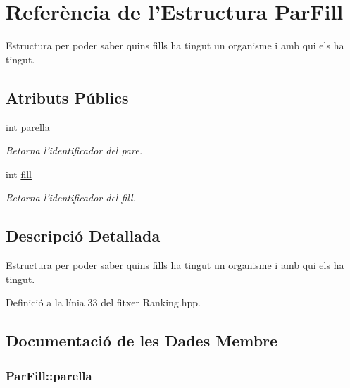 \hypertarget{struct_par_fill}{\section{Referència de l'Estructura Par\-Fill}
\label{struct_par_fill}
}


Estructura per poder saber quins fills ha tingut un organisme i amb qui els ha tingut.  


\subsection*{Atributs Públics}
\begin{DoxyCompactItemize}
\item 
int \hyperlink{struct_par_fill_a30fea0c5089f6968b0f6392911d58fc0}{parella}
\begin{DoxyCompactList}\small\item\em Retorna l'identificador del pare. \end{DoxyCompactList}\item 
int \hyperlink{struct_par_fill_af35c09c217a6bc97860535cc395ebc94}{fill}
\begin{DoxyCompactList}\small\item\em Retorna l'identificador del fill. \end{DoxyCompactList}\end{DoxyCompactItemize}


\subsection{Descripció Detallada}
Estructura per poder saber quins fills ha tingut un organisme i amb qui els ha tingut. 

Definició a la línia 33 del fitxer Ranking.\-hpp.



\subsection{Documentació de les Dades Membre}
\hypertarget{struct_par_fill_a30fea0c5089f6968b0f6392911d58fc0}{
\subsubsection[{parella}]{\setlength{\rightskip}{0pt plus 5cm}Par\-Fill\-::parella}}\label{struct_par_fill_a30fea0c5089f6968b0f6392911d58fc0}


